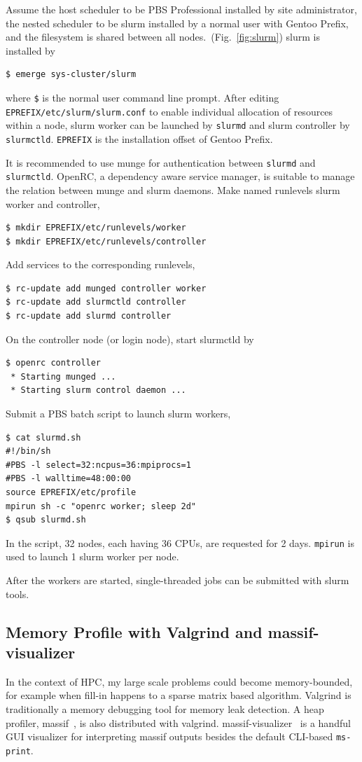 \documentclass[a4paper,conference]{IEEEtran}
\begin{document}
Assume the host scheduler to be PBS Professional installed by site
administrator, the nested scheduler to be slurm installed by a normal
user with Gentoo Prefix, and the filesystem is shared between all
nodes.~(Fig.~\ref{fig:slurm}) slurm is installed by
\begin{verbatim}
$ emerge sys-cluster/slurm
\end{verbatim}
where \texttt{\$} is the normal user command line prompt.  After editing
\texttt{EPREFIX/etc/slurm/slurm.conf} to enable individual
allocation of resources within a node, slurm worker
can be launched by \texttt{slurmd} and slurm controller by
\texttt{slurmctld}.  \texttt{EPREFIX} is the installation offset of
Gentoo Prefix.

It is recommended to use munge for authentication between
\texttt{slurmd} and \texttt{slurmctld}.  OpenRC, a dependency aware
service manager, is suitable to manage the relation between munge and
slurm daemons.  Make named runlevels slurm worker and controller,
\begin{verbatim}
$ mkdir EPREFIX/etc/runlevels/worker
$ mkdir EPREFIX/etc/runlevels/controller
\end{verbatim}
Add services to the corresponding runlevels,
\begin{verbatim}
$ rc-update add munged controller worker
$ rc-update add slurmctld controller
$ rc-update add slurmd controller
\end{verbatim}
On the controller node (or login node), start slurmctld by
\begin{verbatim}
$ openrc controller
 * Starting munged ...
 * Starting slurm control daemon ...
\end{verbatim}
Submit a PBS batch script to launch slurm workers,
\begin{verbatim}
$ cat slurmd.sh
#!/bin/sh
#PBS -l select=32:ncpus=36:mpiprocs=1
#PBS -l walltime=48:00:00
source EPREFIX/etc/profile
mpirun sh -c "openrc worker; sleep 2d"
$ qsub slurmd.sh
\end{verbatim}
In the script, 32 nodes, each having 36 CPUs, are requested for 2
days. \texttt{mpirun} is used to launch 1 slurm worker per node.

After the workers are started, single-threaded jobs can be submitted
with slurm tools.

\subsection{Memory Profile with Valgrind and massif-visualizer}
\label{sec:massif}
In the context of HPC, my large scale problems could become
memory-bounded, for example when fill-in happens to a sparse matrix
based algorithm.  Valgrind is traditionally a memory debugging tool
for memory leak detection.  A heap profiler, massif~\cite{massif}, is
also distributed with valgrind.
massif-visualizer~\cite{massif:visualizer} is a handful GUI visualizer
for interpreting massif outputs besides the default CLI-based
\texttt{ms-print}.
\end{document}
